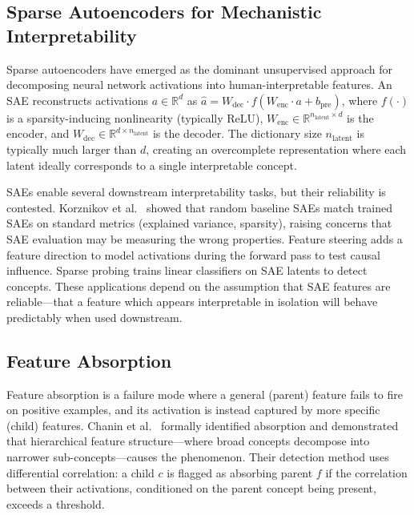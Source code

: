 \documentclass{article}
\begin{document}
\subsection{Sparse Autoencoders for Mechanistic Interpretability}

Sparse autoencoders have emerged as the dominant unsupervised approach for decomposing neural network activations into human-interpretable features. An SAE reconstructs activations $a \in \mathbb{R}^d$ as $\hat{a} = W_{\text{dec}} \cdot f(W_{\text{enc}} \cdot a + b_{\text{pre}})$, where $f(\cdot)$ is a sparsity-inducing nonlinearity (typically ReLU), $W_{\text{enc}} \in \mathbb{R}^{n_{\text{latent}} \times d}$ is the encoder, and $W_{\text{dec}} \in \mathbb{R}^{d \times n_{\text{latent}}}$ is the decoder. The dictionary size $n_{\text{latent}}$ is typically much larger than $d$, creating an overcomplete representation where each latent ideally corresponds to a single interpretable concept.

SAEs enable several downstream interpretability tasks, but their reliability is contested. Korznikov et al.~\cite{korznikov2025ort} showed that random baseline SAEs match trained SAEs on standard metrics (explained variance, sparsity), raising concerns that SAE evaluation may be measuring the wrong properties. Feature steering \cite{marks2024sparse,rimsky2024steering} adds a feature direction to model activations during the forward pass to test causal influence. Sparse probing \cite{templeton2024scaling} trains linear classifiers on SAE latents to detect concepts. These applications depend on the assumption that SAE features are reliable---that a feature which appears interpretable in isolation will behave predictably when used downstream.

\subsection{Feature Absorption}

Feature absorption is a failure mode where a general (parent) feature fails to fire on positive examples, and its activation is instead captured by more specific (child) features. Chanin et al.~\cite{chanin2024quantifying} formally identified absorption and demonstrated that hierarchical feature structure---where broad concepts decompose into narrower sub-concepts---causes the phenomenon. Their detection method uses differential correlation: a child $c$ is flagged as absorbing parent $f$ if the correlation between their activations, conditioned on the parent concept being present, exceeds a threshold.
\end{document}

